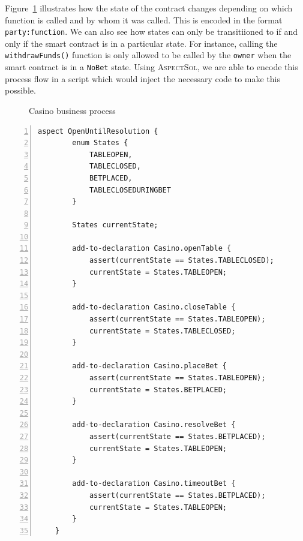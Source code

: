 \documentclass{article}
\newcommand{\AspectSol}{\textsc{AspectSol}\xspace}
\begin{document}
Figure~\ref{f:business-process-casino} illustrates how the state of the contract changes depending on which function is called and by whom it was called. This is encoded in the format \texttt{party:function}. We can also see how states can only be transitiioned to if and only if the smart contract is in a particular state. For instance, calling the \texttt{withdrawFunds()} function is only allowed to be called by the \texttt{owner} when the smart contract is in a \texttt{NoBet} state. Using \AspectSol, we are able to encode this process flow in a script which would inject the necessary code to make this possible.

\begin{figure}[H]
    \centering
    \caption{Casino business process}
    \label{f:business-process-casino}
\end{figure}

\small\begin{lstlisting}[language=Solidity,numbers=left,numbersep=2pt,xleftmargin=0.3cm,label={code:businessProcessFlowScript}, caption={Business Process Flow \AspectSol Script}]
    aspect OpenUntilResolution {
    	enum States {
    		TABLEOPEN,
    		TABLECLOSED,
    		BETPLACED,
    		TABLECLOSEDURINGBET
    	}
    
    	States currentState;
    
    	add-to-declaration Casino.openTable {
    		assert(currentState == States.TABLECLOSED);
    		currentState = States.TABLEOPEN;
    	}
    	
    	add-to-declaration Casino.closeTable {
    		assert(currentState == States.TABLEOPEN);
    		currentState = States.TABLECLOSED;
    	}
    	
    	add-to-declaration Casino.placeBet {
    		assert(currentState == States.TABLEOPEN);
    		currentState = States.BETPLACED;
    	}
    	
    	add-to-declaration Casino.resolveBet {
    		assert(currentState == States.BETPLACED);
    		currentState = States.TABLEOPEN;
    	}
    	
    	add-to-declaration Casino.timeoutBet {
    		assert(currentState == States.BETPLACED);
    		currentState = States.TABLEOPEN;
    	}
    }
\end{lstlisting}\normalsize
		
\end{document}
